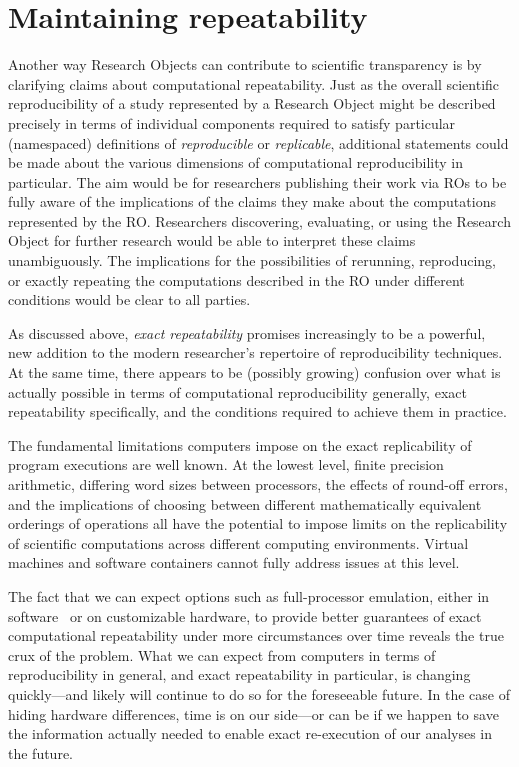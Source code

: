 \section{Maintaining repeatability}\label{sec-limitations}

Another way Research Objects can contribute to scientific transparency is by
	clarifying claims about computational repeatability.
Just as the overall scientific reproducibility of a study represented by a Research Object
	might be described precisely in terms of individual components required to 
	satisfy particular (namespaced) definitions of \emph{reproducible} or \emph{replicable},
	additional statements could be made about the various dimensions of computational
	reproducibility in particular.
The aim would be for researchers publishing their work via ROs to be fully aware
	of the implications of the claims they make about the computations represented
	by the RO.
Researchers discovering, evaluating, or using the Research Object for further research
	 would be able to interpret these claims unambiguously.
The implications for the possibilities of rerunning, reproducing, or exactly repeating the
	computations described in the RO under different conditions would be clear
	to all parties.

As discussed above, \emph{exact repeatability} promises increasingly to be a powerful,
	new addition to the modern researcher's repertoire of reproducibility techniques.
At the same time, there appears to be (possibly growing) confusion over what is actually 
	possible in terms of computational reproducibility generally, exact repeatability 
	specifically, and the conditions required to achieve them in practice.

The fundamental limitations computers impose on the exact replicability of program executions
	are well known.
At the lowest level, finite precision arithmetic, differing word sizes between processors,
	the effects of round-off errors, and the implications of choosing between different 
	mathematically equivalent orderings of operations all have the potential to 
	impose limits on the replicability of scientific computations across different computing environments.
Virtual machines and software containers cannot fully address issues at this level.

The fact that we can expect options such as full-processor emulation, either in software~\cite{QEMU} 
	or on customizable hardware, 
	to provide better guarantees of exact computational repeatability under more circumstances
	over time reveals the true crux of the problem.
What we can expect from computers in terms of reproducibility in general, and exact
	repeatability in particular, is changing quickly---and likely will continue to do so for the
	foreseeable future.
In the case of hiding hardware differences, time is on our side---or can be if we happen to save the
	information actually needed to enable exact re-execution of our analyses in the future.

